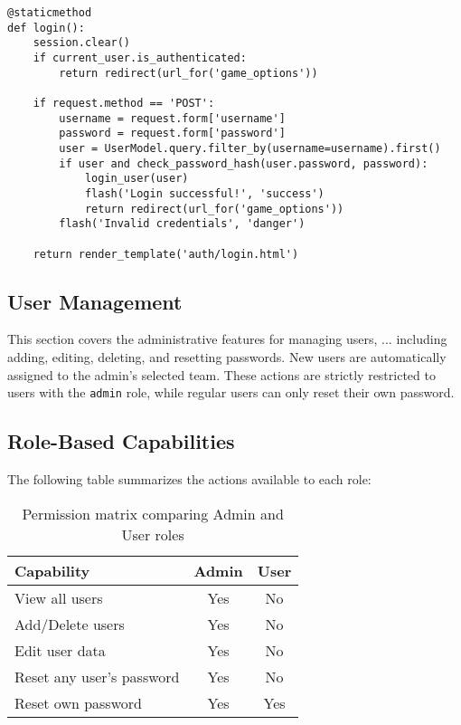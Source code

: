 \documentclass[12pt]{article}
\begin{document}
\begin{verbatim}
@staticmethod
def login():
    session.clear()
    if current_user.is_authenticated:
        return redirect(url_for('game_options'))

    if request.method == 'POST':
        username = request.form['username']
        password = request.form['password']
        user = UserModel.query.filter_by(username=username).first()
        if user and check_password_hash(user.password, password):
            login_user(user)
            flash('Login successful!', 'success')
            return redirect(url_for('game_options'))
        flash('Invalid credentials', 'danger')

    return render_template('auth/login.html')
\end{verbatim}

\subsection{User Management}

This section covers the administrative features for managing users, ... including adding, editing, deleting, and resetting passwords. New users are automatically assigned to the admin’s selected team.
These actions are strictly restricted to users with the \texttt{admin} role, while regular users can only reset their own password.

\subsection{Role-Based Capabilities}

The following table summarizes the actions available to each role:

\begin{table}[h!]
\centering
\renewcommand{\arraystretch}{1.2}
\begin{tabularx}{\textwidth}{|X|c|c|}
\hline
\textbf{Capability} & \textbf{Admin} & \textbf{User} \\
\hline
View all users            & Yes & No \\
Add/Delete users             & Yes & No \\
Edit user data            & Yes & No \\
Reset any user's password & Yes & No \\
Reset own password        & Yes & Yes \\
\hline
\end{tabularx}
\caption{Permission matrix comparing Admin and User roles}
\end{table}
\end{document}
